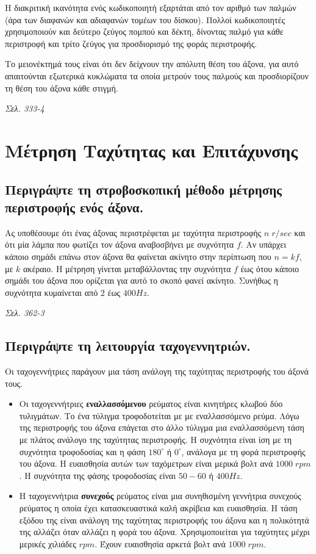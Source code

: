 \documentclass{article}
\begin{document}
Η διακριτική ικανότητα ενός κωδικοποιητή εξαρτάται από τον αριθμό των παλμών (άρα των διαφανών και αδιαφανών τομέων του δίσκου). Πολλοί κωδικοποιητές χρησιμοποιούν 
και δεύτερο ζεύγος πομπού και δέκτη, δίνοντας παλμό για κάθε περιστροφή και τρίτο ζεύγος για προσδιορισμό της φοράς περιστροφής. 

Το μειονέκτημά τους είναι ότι δεν δείχνουν την απόλυτη θέση του άξονα, για αυτό απαιτούνται εξωτερικά κυκλώματα τα οποία μετρούν τους παλμούς και προσδιορίζουν τη θέση του
άξονα κάθε στιγμή.

\emph{Σελ. 333-4}


\section{Μέτρηση Ταχύτητας και Επιτάχυνσης}
\subsection{Περιγράψτε τη στροβοσκοπική μέθοδο μέτρησης περιστροφής ενός άξονα.}
Ας υποθέσουμε ότι ένας άξονας περιστρέφεται με ταχύτητα περιστροφής $n\;r/sec$ και ότι μία λάμπα που φωτίζει τον άξονα αναβοσβήνει με συχνότητα $f$. Αν υπάρχει κάποιο 
σημάδι επάνω στον άξονα θα φαίνεται ακίνητο στην περίπτωση που $n=kf$, με $k$ ακέραιο. Η μέτρηση γίνεται μεταβάλλοντας την συχνότητα $f$ έως ότου κάποιο σημάδι του άξονα
που ορίζεται για αυτό το σκοπό φανεί ακίνητο. Συνήθως η συχνότητα κυμαίνεται από $2$ έως $400 Hz$.

\emph{Σελ. 362-3}

\subsection{Περιγράψτε τη λειτουργία ταχογεννητριών.}
Οι ταχογεννήτριες παράγουν μια τάση ανάλογη της ταχύτητας περιστροφής του άξονά τους.

\begin{itemize}
    \item Οι ταχογεννήτριες \textbf{εναλλασσόμενου} ρεύματος είναι κινητήρες κλωβού δύο τυλιγμάτων. Το ένα τύλιγμα τροφοδοτείται με με εναλλασσόμενο ρεύμα. Λόγω της 
        περιστροφής του άξονα επάγεται στο άλλο τύλιγμα μια εναλλασσόμενη τάση με πλάτος ανάλογο της ταχύτητας περιστροφής. Η συχνότητα είναι ίση με τη συχνότητα 
        τροφοδοσίας και η φάση $180^\circ$ ή $0^\circ$, ανάλογα με τη φορά περιστροφής του άξονα. Η ευαισθησία αυτών των ταχόμετρων είναι μερικά βολτ ανά $1000\; rpm$.
        Η συχνότητα της φάσης τροφοδοσίας είναι $50-60$ ή $400Hz$. 
    \item Η ταχογεννήτρια \textbf{συνεχούς} ρεύματος είναι μια συνηθισμένη γεννήτρια συνεχούς ρεύματος η οποία έχει κατασκευαστικά καλή ακρίβεια και ευαισθησία. Η
        τάση εξόδου της είναι ανάλογη της ταχύτητας περιστροφής του άξονα και η πολικότητά της αλλάζει όταν αλλάζει η φορά του άξονα. Χρησιμοποιείται για ταχύτητες
        μέχρι μερικές χιλιάδες $rpm$. Έχουν ευαισθησία αρκετά βολτ ανά $1000\; rpm$.
\end{itemize}
\end{document}
